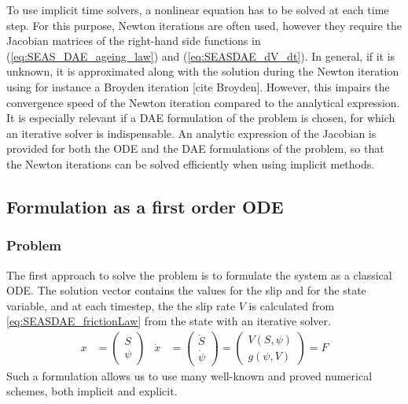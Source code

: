 To use implicit time solvers, a nonlinear equation has to be solved at each time step. For this purpose, Newton iterations are often used, however they require the Jacobian matrices of the right-hand side functions in (\ref{eq:SEAS_DAE_ageing_law}) and (\ref{eq:SEASDAE_dV_dt}). In general, if it is unknown, it is approximated along with the solution during the Newton iteration using for instance a Broyden iteration [cite Broyden]. However, this impairs the convergence speed of the Newton iteration compared to the analytical expression. It is especially relevant if a DAE formulation of the problem is chosen, for which an iterative solver is indispensable. An analytic expression of the Jacobian is provided for both the ODE and the DAE formulations of the problem, so that the Newton iterations can be solved efficiently when using implicit methods.
 

\subsection{Formulation as a first order ODE}
\subsubsection{Problem}
The first approach to solve the problem is to formulate the system as a classical ODE. The solution vector contains the values for the slip and for the state variable, and at each timestep, the the slip rate $V$ is calculated from \autoref{eq:SEASDAE_frictionLaw} from the state with an iterative solver.
\begin{align}
	\label{eq:ODE_formulation_SEAS}
	x &= \begin{pmatrix}
		S \\ \psi
	\end{pmatrix} & \dot{x} &= \begin{pmatrix}
								  \dot{S} \\ \dot{\psi}
							   \end{pmatrix} = \begin{pmatrix}
												   V(S,\psi) \\ g(\psi, V)
											   \end{pmatrix} = F
\end{align} 
Such a formulation allows us to use many well-known and proved numerical schemes, both implicit and explicit. 

